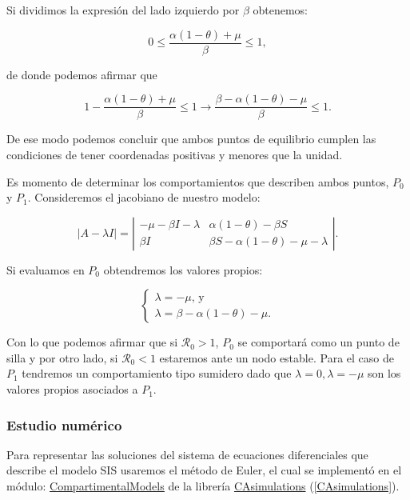 Si dividimos la expresión del lado izquierdo por $\beta$ obtenemos:

$$0\leq \frac{\alpha(1-\theta)+\mu}{\beta}\leq1,$$

de donde podemos afirmar que 

$$1-\frac{\alpha(1-\theta)+\mu}{\beta}\leq1 \longrightarrow \frac{\beta-\alpha(1-\theta)-\mu}{\beta}\leq1.$$

De ese modo podemos concluir que ambos puntos de equilibrio cumplen las condiciones de tener coordenadas positivas y menores que la unidad.

Es momento de determinar los comportamientos que describen ambos puntos, $P_0$ y $P_1$. Consideremos el jacobiano de nuestro modelo:

$$|A-\lambda I|=
\left|\begin{array}{cc}
-\mu-\beta I-\lambda & \alpha(1-\theta)-\beta S \\
\beta I & \beta S-\alpha(1-\theta)-\mu-\lambda
\end{array}\right|.$$

Si evaluamos en $P_0$ obtendremos los valores propios:

$$\left\{\begin{array}{l}\lambda=-\mu\text{, y}\\
\lambda=\beta-\alpha(1-\theta)-\mu.\end{array}\right.$$

Con lo que podemos afirmar que si $\mathcal{R}_0>1$, $P_0$ se comportará como un punto de silla y por otro lado, si $\mathcal{R}_0<1$ estaremos ante un nodo estable. Para el caso de $P_1$ tendremos un comportamiento tipo sumidero dado que $\lambda=0,\lambda=-\mu$ son los valores propios asociados a $P_1$.

\subsubsection{Estudio numérico}

Para representar las soluciones del sistema de ecuaciones diferenciales que describe el modelo SIS usaremos el método de Euler, el cual se implementó en el módulo:
\href{https://github.com/Grupo-de-simulacion-con-automatas/Prediccion-del-comportamiento-de-una-enfermedad-simulada-en-AC-con-un-algoritmo-en-RN/blob/master/Codigo/1.\%20Modelos\%20compartimentales\%20en\%20ecuaciones\%20diferenciales.ipynb}{\underline{CompartimentalModels}} de la librería \href{https://github.com/Grupo-de-simulacion-con-automatas/Prediccion-del-comportamiento-de-una-enfermedad-simulada-en-AC-con-un-algoritmo-en-RN/tree/master/Codigo/CAsimulation}{CAsimulations} (\ref{CAsimulations}).


